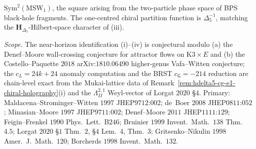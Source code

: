 \begin{proposition}
\begin{enumerate}[label=(\roman*),leftmargin=1.5em]
 $\mathrm{Sym}^2(\mathrm{MSW}_1)$, the square arising from the
 two-particle phase space of BPS black-hole fragments. The
 one-centred chiral partition function is $\Delta_5^{-1}$, matching
 the $\mathbf H_{\Delta_5}$-Hilbert-space character of (iii).
\end{enumerate}
\emph{Scope.} The near-horizon identification (i)--(iv) is conjectural
modulo (a) the Denef--Moore wall-crossing conjecture for attractor
flows on $\mathrm{K3}\times E$ and (b) the Costello--Paquette $2018$
arXiv:$1810.06490$ higher-genus Vafa--Witten conjecture; the
$c_L=24k+24$ anomaly computation and the BRST $c_{\mathsf G}=-214$
reduction are chain-level exact from the Mukai-lattice data of
Remark~\ref{rem:hdelta5-cg-e1-chiral-holography}(i) and the
$\Lambda^{2,1}_{II}$ Weyl-vector of Lorgat $2020$ \S$4$. Primary:
Maldacena--Strominger--Witten $1997$ JHEP$9712$:$002$;
de~Boer $2008$ JHEP$0811$:$052$;
Minasian--Moore $1997$ JHEP$9711$:$002$;
Denef--Moore $2011$ JHEP$1111$:$129$;
Feigin--Frenkel $1990$ Phys.\ Lett.\ B$246$;
Bruinier $1999$ Invent.\ Math.\ $138$ Thm.\ $4.5$;
Lorgat $2020$ \S$1$ Thm.\ $2$, \S$4$ Lem.\ $4$, Thm.\ $3$;
Gritsenko--Nikulin $1998$ Amer.\ J.\ Math.\ $120$;
Borcherds $1998$ Invent.\ Math.\ $132$.
\end{proposition}

